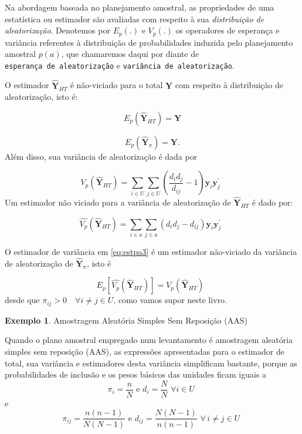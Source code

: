 \documentclass[
  12pt,
  brazilian,
]{book}
\theoremstyle{definition}
\theoremstyle{definition}
\newtheorem{example}{Exemplo}[chapter]
\theoremstyle{definition}
\theoremstyle{definition}
\theoremstyle{remark}
\begin{document}
Na abordagem baseada no planejamento amostral, as propriedades de uma estatística ou estimador são avaliadas com respeito à sua \emph{distribuição de aleatorização}. Denotemos por \(E_p(.)\) e \(V_p(.)\) os operadores de esperança e variância referentes à distribuição de probabilidades induzida pelo planejamento amostral \(p(a)\), que chamaremos daqui por diante de \texttt{esperança\ de\ aleatorização} e \texttt{variância\ de\ aleatorização}.

O estimador \(\mathbf{\hat{Y}}_{HT}\) é não-viciado para o total \(\mathbf{Y}\) com respeito à distribuição de aleatorização, isto é:

\[
E_p \left( \mathbf{\widehat{Y}}_{HT} \right) = \mathbf{Y} 
\]

\[
E_p \left( \mathbf{\hat{Y}}_{\pi} \right) = \mathbf{Y} . 
\]
Além disso, sua variância de aleatorização é dada por

\[
V_p \left( \mathbf{\widehat{Y}}_{HT} \right) = \sum_{i \in U} \sum_{j \in U} \left( \frac{d_i d_j}{d_{ij}} - 1 \right) \mathbf{y}_i {\mathbf{y}^\prime_j}  \,\,\,  \label{eq:estpa2}
\]
Um estimador não viciado para a variância de aleatorização de \(\mathbf{ \hat{Y}}_{HT}\) é dado por:

\[
\widehat{V_p} \left( \mathbf{\widehat{Y}}_{HT} \right) =\sum_{i \in a} \sum_{j \in a} \left( {d_i d_j} - d_{ij} \right) \mathbf{y}_i {\mathbf{y}^\prime_j}  \,\,\, \label{eq:estpa3}
\]

O estimador de variância em \eqref{eq:estpa3} é um estimador não-viciado da variância de aleatorização de \(\mathbf{\hat{Y}}_{\pi}\), isto é

\[
E_p \left[ \widehat{V_p} \left( \mathbf{\widehat{Y}}_{HT} \right) \right] = V_p \left( \mathbf{\widehat{Y}}_{HT} \right) \,\,\, \label{eq:estpa4}
\]
desde que \(\pi_{ij} > 0 \quad \forall i \neq j \in U\), como vamos supor neste livro.

\begin{example}
\protect\hypertarget{exm:exe31}{}{\label{exm:exe31} }Amostragem Aleatória Simples Sem Reposição (AAS)
\end{example}

Quando o plano amostral empregado num levantamento é amostragem aleatória simples sem reposição (AAS), as expressões apresentadas para o estimador de total, sua variância e estimadores desta variância simplificam bastante, porque as probabilidades de inclusão e os pesos básicos das unidades ficam iguais a
\[
\pi_i = \frac{n}{N} \,\, \text{e} \,\, d_i = \frac{N}{N} \, \, \forall i \in U  \,\, \label{eq:estpa5}
\]
e
\[
\pi_{ij} = \frac{n(n-1)}{N(N-1)} \,\, \text{e} \,\,  d_{ij} = \frac{N(N-1)}{n(n-1)} \,\, \forall \, i \neq j \in U \,\, \label{eq:estpa6} 
\]
\end{document}
